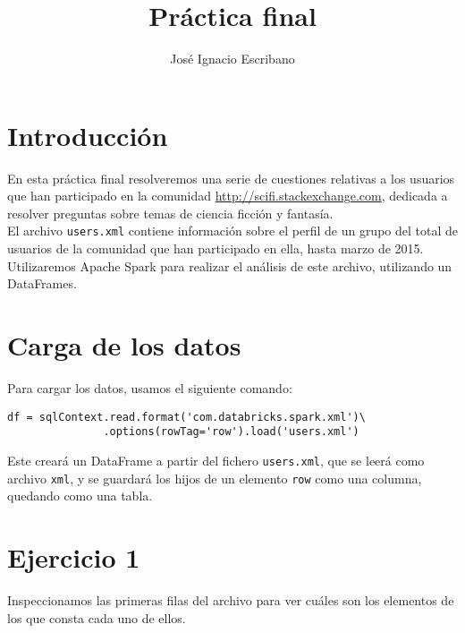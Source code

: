 \documentclass[12pt,a4paper,twoside,openright,titlepage,final]{article}
\author{José Ignacio Escribano}
\title{Práctica final}
\begin{document}
\setcounter{page}{1}


\listoftables
\thispagestyle{empty}
\newpage

\tableofcontents
\thispagestyle{empty}
\newpage


\setcounter{page}{1}

\section{Introducción}

En esta práctica final resolveremos una serie de cuestiones relativas a los usuarios que han participado en la comunidad \url{http://scifi.stackexchange.com}, dedicada a resolver preguntas sobre temas de ciencia ficción y fantasía.\\

El archivo \texttt{users.xml} contiene información sobre el perfil de un grupo del total de usuarios de la comunidad que han participado en ella, hasta marzo de 2015.\\

Utilizaremos Apache Spark para realizar el análisis de este archivo, utilizando un DataFrames.

\section{Carga de los datos}

Para cargar los datos, usamos el siguiente comando:

\begin{verbatim}
df = sqlContext.read.format('com.databricks.spark.xml')\
               .options(rowTag='row').load('users.xml')
\end{verbatim}

Este creará un DataFrame a partir del fichero \texttt{users.xml}, que se leerá como archivo \texttt{xml}, y se guardará los hijos de un elemento \texttt{row} como una columna, quedando como una tabla.

\section{Ejercicio 1}

Inspeccionamos las primeras filas del archivo para ver cuáles son los elementos de los que consta cada uno de ellos.
\end{document}
